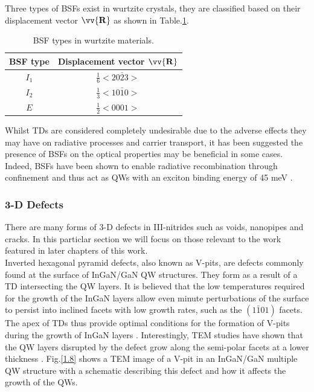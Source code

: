 Three types of BSFs exist in wurtzite crystals, they are classified based on their displacement vector $\mathbf{\vv{R}}$ as shown in Table.\ref{tab1.5}.

\begin{table}[h]
	\centering
	\begin{tabular}{cc}
		\centering
		\textbf{BSF type}& \textbf{Displacement vector $\mathbf{\vv{R}}$ } \\
		\hline
		$I_{1}$  & $\frac{1}{6}<20\bar{2}3>$ \\
		$I_{2}$ & $\frac{1}{3}<10\bar{1}0>$ \\
		$E$  & $\frac{1}{2}<0001>$ \\
		\hline
		
	\end{tabular}
	\caption{BSF types in wurtzite materials.}
	\label{tab1.5}
\end{table}
\FloatBarrier

Whilst TDs are considered completely undesirable due to the adverse effects they may have on radiative processes and carrier transport, it has been suggested the presence of BSFs on the optical properties may be beneficial in some cases. Indeed, BSFs have been shown to enable radiative recombination through confinement and thus act as QWs with an exciton binding energy of 45 meV \cite{Rebane1997}.

\subsubsection{3-D Defects}

There are many forms of 3-D defects in III-nitrides such as voids, nanopipes and cracks. In this particlar section we will focus on those relevant to the work featured in later chapters of this work.\\
Inverted hexagonal pyramid defects, also known as V-pits, are defects commonly found at the surface of InGaN/GaN QW structures. They form as a result of a TD intersecting the QW layers. It is believed that the low temperatures required for the growth of the InGaN layers allow even minute perturbations of the surface to persist into inclined facets with low growth rates, such as the $(1\bar{1}01)$ facets. The apex of TDs thus provide optimal conditions for the formation of V-pits during the growth of InGaN layers \cite{Hangleiter2005}. Interestingly, TEM studies have shown that the QW layers disrupted by the defect grow along the semi-polar facets at a lower thickness \cite{Hangleiter2005,Han2013,Tsai2007}. Fig.\ref{1.8} shows a TEM image of a V-pit in an InGaN/GaN multiple QW structure with a schematic describing this defect and how it affects the growth of the QWs.

